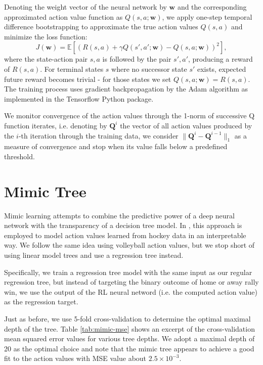 \documentclass{sfuthesis}
\begin{document}
	Denoting the weight vector of the neural network by $\mathbf{w}$ and the corresponding approximated action value function as $Q(s,a;\mathbf{w})$, we apply one-step temporal difference bootstrapping \cite{sutton2018reinforcement} to approximate the true action values $Q(s,a)$ and minimize the loss function:
	$$J(\mathbf{w}) = \mathbb{E}[(R(s,a) + \gamma Q(s', a'; \mathbf{w}) - Q(s,a;\mathbf{w}))^2],$$
	where the state-action pair $s,a$ is followed by the pair $s',a'$, producing a reward of $R(s,a)$. For terminal states $s$ where no successor state $s'$ exists, expected future reward becomes trivial - for those states we set $Q(s,a;\mathbf{w}) = R(s,a)$.\\ The training process uses gradient backpropagation by the Adam algorithm \cite{kingma2014adam} as implemented in the Tensorflow Python package.
	
	We monitor convergence of the action values through the 1-norm of successive Q function iterates, i.e. denoting by $\mathbf{Q}^i$ the vector of all action values produced by the $i$-th iteration through the training data, we consider  $\|\mathbf{Q}^i - \mathbf{Q}^{i-1}\|_1$ as a measure of convergence and stop when its value falls below a predefined threshold.
	
	\section{Mimic Tree}
	
	Mimic learning attempts to combine the predictive power of a deep neural network with the transparency of a decision tree model. In \cite{sun2020cracking}, this approach is employed to model action values learned from hockey data in an interpretable way. We follow the same idea using volleyball action values, but we stop short of using linear model trees and use a regression tree instead.
	
	Specifically, we train a regression tree model with the same input as our regular regression tree, but instead of targeting the binary outcome of home or away rally win, we use the output of the RL neural netword (i.e. the computed action value) as the regression target.
	
	Just as before, we use 5-fold cross-validation to determine the optimal maximal depth of the tree. Table \ref{tab:mimic-mse} shows an excerpt of the cross-validation mean squared error values for various tree depths. We adopt a maximal depth of 20 as the optimal choice and note that the mimic tree appears to achieve a good fit to the action values with MSE value about $2.5\times10^{-3}$.
	
\end{document}

